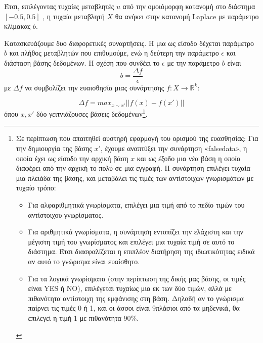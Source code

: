 Έτσι, επιλέγοντας τυχαίες μεταβλητές $u$ από την ομοιόμορφη κατανομή στο διάστημα  $[-0.5, 0.5]$ , η τυχαία μεταβλητή $X$ θα ανήκει στην κατανομή \textlatin{Laplace} με παράμετρο κλίμακας $b$. 

Κατασκευάζουμε δυο διαφορετικές συναρτήσεις. Η μια ως είσοδο δέχεται παράμετρο $b$ και πλήθος μεταβλητών που επιθυμούμε, ενώ η δεύτερη την παράμετρο $\epsilon$ και διάσταση βάσης δεδομένων.
H σχέση που συνδέει το $\epsilon$ με την παράμετρο $b$ είναι 
$$b=\frac{\Delta f}{\epsilon}$$
με $\Delta f$ να συμβολίζει την ευαισθησία  μιας συνάρτησης $f:X \longrightarrow \mathbb{R}^k:$

$$\Delta f=max_{x\sim x'}||f(x)-f(x')||$$
όπου $x,x'$ δύο γειτνιάζουσες βάσεις δεδομένων\footnote{
Σε περίπτωση που απαιτηθεί αυστηρή εφαρμογή του ορισμού της ευασθησίας: Για την δημιουργία της βάσης $x'$, έχουμε αναπτύξει την συνάρτηση «\textlatin{falsedata}», η οποία έχει ως είσοδο την αρχική βάση $x$ και ως έξοδο μια νέα βάση η οποία διαφέρει από την αρχική το πολύ σε μια εγγραφή. Η συνάρτηση επιλέγει τυχαία μια πλειάδα της βάσης, και μεταβάλει τις τιμές των αντίστοιχων γνωρισμάτων με τυχαίο τρόπο:
\begin{itemize}
    \item Για αλφαριθμητικά γνωρίσματα, επιλέγει μια τιμή από το πεδίο τιμών του αντίστοιχου γνωρίσματος.
    \item Για αριθμητικά γνωρίσματα, η συνάρτηση εντοπίζει την ελάχιστη και την μέγιστη τιμή του γνωρίσματος και επιλέγει μια τυχαία τιμή σε αυτό το διάστημα. Έτσι διασφαλίζεται η επιπλέον διατήρηση της ιδιωτικότητας ειδικά αν αυτό το γνώρισμα είναι ευαίσθητο.
    \item Για τα λογικά γνωρίσματα (στην περίπτωση της δικής μας βάσης, οι τιμές είναι \textlatin{YES} ή \textlatin{NO}),
    επιλέγεται τυχαίως μια εκ των δύο τιμών, αλλά με πιθανότητα αντίστοιχη της εμφάνισης στη βάση. Δηλαδή αν το γνώρισμα παίρνει τις τιμές 0 ή 1, και οι άσσοι είναι 9πλάσιοι από τα μηδενικά, θα επιλεγεί η τιμή 1 με πιθανότητα 90\%. 
\end{itemize}
}.





